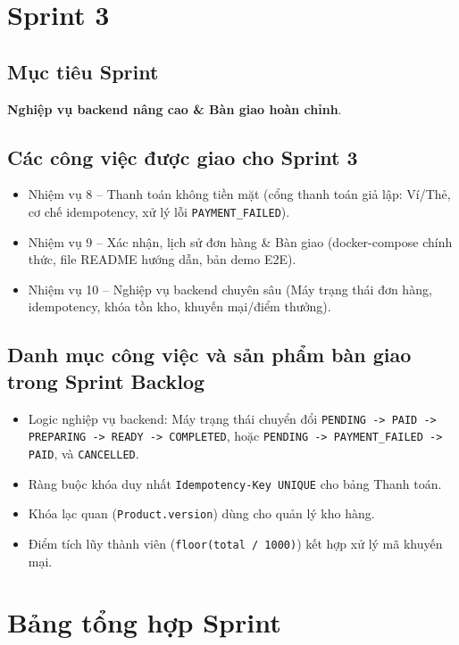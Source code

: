 \documentclass[12pt, a4paper]{article}
\begin{document}
\section{Sprint 3}
\label{sec:sprint3}

\subsection{Mục tiêu Sprint}
\textbf{Nghiệp vụ backend nâng cao \& Bàn giao hoàn chỉnh}.

\subsection{Các công việc được giao cho Sprint 3}
\begin{itemize}
  \item Nhiệm vụ 8 -- Thanh toán không tiền mặt (cổng thanh toán giả lập: Ví/Thẻ, cơ chế idempotency, xử lý lỗi \texttt{PAYMENT\_FAILED}).
  \item Nhiệm vụ 9 -- Xác nhận, lịch sử đơn hàng \& Bàn giao (docker-compose chính thức, file README hướng dẫn, bản demo E2E).
  \item Nhiệm vụ 10 -- Nghiệp vụ backend chuyên sâu (Máy trạng thái đơn hàng, idempotency, khóa tồn kho, khuyến mại/điểm thưởng).
\end{itemize}

\subsection{Danh mục công việc và sản phẩm bàn giao trong Sprint Backlog}
\begin{itemize}
  \item Logic nghiệp vụ backend: Máy trạng thái chuyển đổi \texttt{PENDING -> PAID -> PREPARING -> READY -> COMPLETED}, hoặc \texttt{PENDING -> PAYMENT\_FAILED -> PAID}, và \texttt{CANCELLED}.
  \item Ràng buộc khóa duy nhất \texttt{Idempotency-Key UNIQUE} cho bảng Thanh toán.
  \item Khóa lạc quan (\texttt{Product.version}) dùng cho quản lý kho hàng.
  \item Điểm tích lũy thành viên (\texttt{floor(total / 1000)}) kết hợp xử lý mã khuyến mại.
\end{itemize}

\section{Bảng tổng hợp Sprint}
\end{document}
